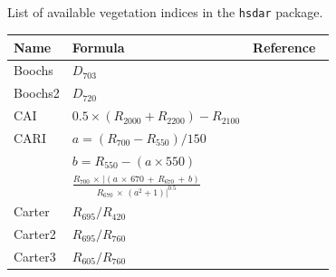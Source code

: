 \documentclass[remotesensing,article,accept,moreauthors,pdftex]{Definitions/mdpi}
\begin{document}
\begin{paracol}{2}
\subsection{}
\vspace{-12pt}
\renewcommand{\thespecialtable}{A\arabic{specialtable}}
\begin{specialtable}[H]
\setlength{\tabcolsep}{10.4mm}
{
	\caption{List of available vegetation indices in the \texttt{hsdar} package.}
	\begin{tabular}{lll}\toprule
		\bfseries{Name} & \bfseries{Formula}                                                                                   & \bfseries{Reference~}
         \\		\midrule
		Boochs          & $D_{703}$                                                                                            &~\cite{boochs1990}             \\
		Boochs2         & $D_{720}$                                                                                            &~\cite{boochs1990}             \\
		CAI             & $0.5 \times (R_{2000} + R_{2200}) -R_{2100}$                                                         &~\cite{nagler2003}             \\
		\midrule
		CARI            & $a = (R_{700}-R_{550}) / 150$                                                                        &~\cite{walthall1994}           \\
		& $b = R_{550}-(a\times 550)$                                                                          &                               \\
		& $\frac{R_{700}\,\times\, | (a\,\times\,670\,+\,R_{670}\,+\,b)}{R_{670}\,\times\,(a^2+1)| ^{0.5}}$                       &                               \\
		\midrule
		Carter          & $R_{695}/R_{420}$                                                                                    &~\cite{carter1994}             \\
		Carter2         & $R_{695}/R_{760}$                                                                                    &~\cite{carter1994}             \\
		Carter3         & $R_{605}/R_{760}$                                                                                    &~\cite{carter1994}             \\

\end{tabular}}
\end{specialtable}
\end{paracol}
\end{document}
